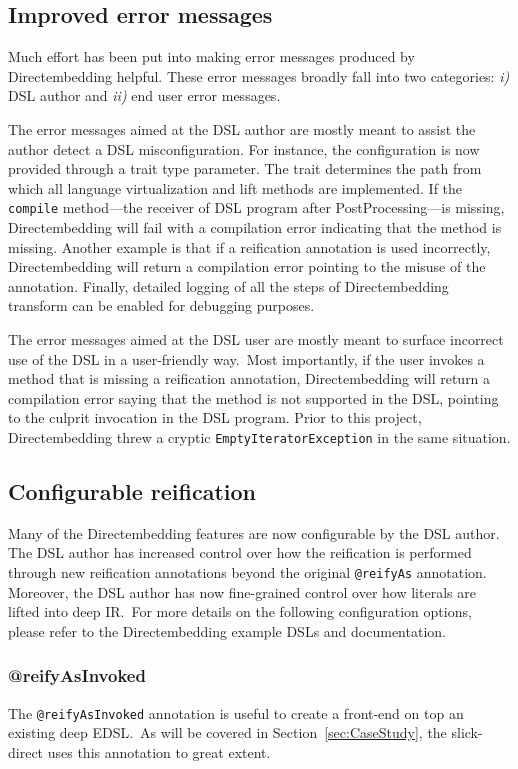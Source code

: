 \subsection{Improved error messages} %
\label{sub:Improvederrormessages}
Much effort has been put into making error messages produced by Directembedding helpful.
These error messages broadly fall into two categories: \emph{i)} DSL author and \emph{ii)} end user error messages.

The error messages aimed at the DSL author are mostly meant to assist the author detect a DSL misconfiguration.
For instance, the configuration is now provided through a trait type parameter.
The trait determines the path from which all language virtualization and lift methods are implemented.
If the \texttt{compile} method---the receiver of DSL program after PostProcessing---is missing, Directembedding will fail with a compilation error indicating that the method is missing.
Another example is that if a reification annotation is used incorrectly, Directembedding will return a compilation error pointing to the misuse of the annotation.
Finally, detailed logging of all the steps of Directembedding transform can be enabled for debugging purposes.

The error messages aimed at the DSL user are mostly meant to surface incorrect use of the DSL in a user-friendly way.\
Most importantly, if the user invokes a method that is missing a reification annotation, Directembedding will return a compilation error saying that the method is not supported in the DSL, pointing to the culprit invocation in the DSL program.
Prior to this project, Directembedding threw a cryptic \texttt{EmptyIteratorException} in the same situation.

\subsection{Configurable reification} %
\label{sub:Configurablereification}
Many of the Directembedding features are now configurable by the DSL author.
The DSL author has increased control over how the reification is performed through new reification annotations beyond the original \texttt{@reifyAs} annotation.
Moreover, the DSL author has now fine-grained control over how literals are lifted into deep IR.\
For more details on the following configuration options, please refer to the Directembedding example DSLs and documentation.

\subsubsection{@reifyAsInvoked} %
\label{sub:reifyAsInvoked}
The \texttt{@reifyAsInvoked} annotation is useful to create a front-end on top an existing deep EDSL.\
As will be covered in Section~\ref{sec:CaseStudy}, the slick-direct uses this annotation to great extent.

